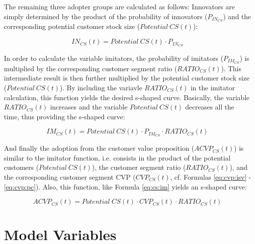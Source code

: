 The remaining three adopter groups are calculated as follows: Innovators are simply determined by the product of the probability of innovators ($P_{IN_{CS}}$) and the corresponding potential customer stock size \linebreak ($\mathit{Potential~CS(t)}$):

\begin{equation}\label{eq:cs:in}
		IN_{CS}(t) = \mathit{Potential~CS(t)} \cdot P_{IN_{CS}}
\end{equation}

In order to calculate the variable imitators, the probability of imitators ($P_{IM_{CS}}$) is multiplied by the corresponding customer segment ratio ($RATIO_{CS}(t)$). This intermediate result is then further multiplied by the potential customer stock size ($\mathit{Potential~CS(t)}$). By including the variavle $RATIO_{CS}(t)$ in the imitator calculation, this function yields the desired s-shaped curve. Basically, the variable $RATIO_{CS}(t)$ increases and the variable $\mathit{Potential~CS(t)}$ decreases all the time, thus providing the s-shaped curve:

\begin{equation}\label{eq:cs:im}
		IM_{CS}(t) = \mathit{Potential~CS(t)} \cdot P_{IM_{CS}} \cdot RATIO_{CS}(t)
\end{equation}

And finally the adoption from the customer value proposition \linebreak ($ACVP_{CS}(t)$) is similar to the imitator function, i.e. consists in the product of the potential customers ($\mathit{Potential~CS(t)}$), the customer segment ratio ($RATIO_{CS}(t)$), and the corresponding customer segment \ac{CVP} ($CVP_{CS}(t)$, cf. Formulas \ref{eq:cvp:isv} - \ref{eq:cvp:pc}). Also, this function, like Formula \ref{eq:cs:im} yields an s-shaped curve:

\begin{equation}\label{eq:cs:acvp}
		ACVP_{CS}(t) = \mathit{Potential~CS(t)} \cdot CVP_{CS}(t) \cdot RATIO_{CS}(t)
\end{equation}

\section{Model Variables}\label{ch:sfd:mv}

